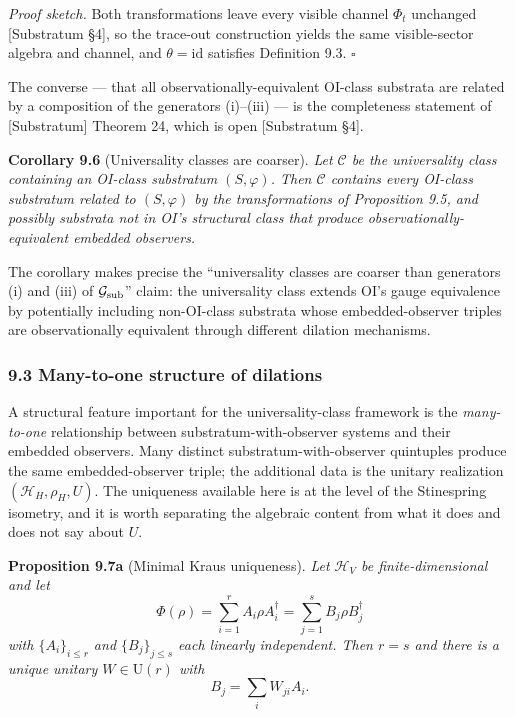 \documentclass[
]{article}
\begin{document}
\emph{Proof sketch.} Both transformations leave every visible channel
\(\Phi_t\) unchanged {[}Substratum §4{]}, so the trace-out construction
yields the same visible-sector algebra and channel, and
\(\theta = \mathrm{id}\) satisfies Definition 9.3. \(\square\)

The converse --- that all observationally-equivalent OI-class substrata
are related by a composition of the generators (i)--(iii) --- is the
completeness statement of {[}Substratum{]} Theorem 24, which is open
{[}Substratum §4{]}.

\textbf{Corollary 9.6} (Universality classes are coarser). \emph{Let
\(\mathcal{C}\) be the universality class containing an OI-class
substratum \((S, \varphi)\). Then \(\mathcal{C}\) contains every
OI-class substratum related to \((S, \varphi)\) by the transformations
of Proposition 9.5, and possibly substrata not in OI's structural class
that produce observationally-equivalent embedded observers.}

The corollary makes precise the ``universality classes are coarser than
generators (i) and (iii) of \(\mathcal{G}_{\rm sub}\)'' claim: the
universality class extends OI's gauge equivalence by potentially
including non-OI-class substrata whose embedded-observer triples are
observationally equivalent through different dilation mechanisms.

\hypertarget{many-to-one-structure-of-dilations}{%
\subsubsection{9.3 Many-to-one structure of
dilations}\label{many-to-one-structure-of-dilations}}

A structural feature important for the universality-class framework is
the \emph{many-to-one} relationship between substratum-with-observer
systems and their embedded observers. Many distinct
substratum-with-observer quintuples produce the same embedded-observer
triple; the additional data is the unitary realization
\((\mathcal{H}_H, \rho_H, U)\). The uniqueness available here is at the
level of the Stinespring isometry, and it is worth separating the
algebraic content from what it does and does not say about \(U\).

\textbf{Proposition 9.7a} (Minimal Kraus uniqueness). \emph{Let
\(\mathcal{H}_V\) be finite-dimensional and let}
\[\Phi(\rho) = \sum_{i=1}^{r} A_i \rho A_i^\dagger = \sum_{j=1}^{s} B_j \rho B_j^\dagger\]
\emph{with \(\{A_i\}_{i \le r}\) and \(\{B_j\}_{j \le s}\) each linearly
independent. Then \(r = s\) and there is a unique unitary
\(W \in \mathrm{U}(r)\) with} \[B_j = \sum_i W_{ji} A_i .\]
\end{document}
